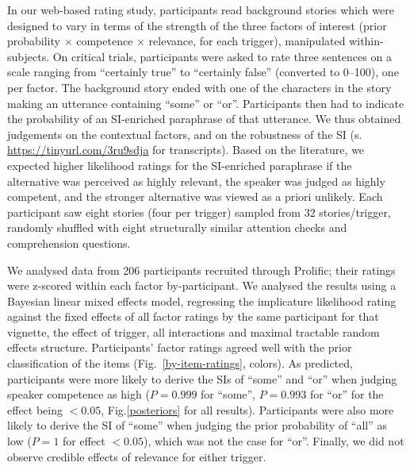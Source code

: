 \documentclass[11pt,letterpaper]{article}
\begin{document}
In our web-based rating study, participants read background stories which were designed to vary in terms of the strength of the three factors of interest (prior probability $\times$ competence $\times$ relevance, for each trigger), manipulated within-subjects. 
On critical trials, participants were asked to rate three sentences on a scale ranging from ``certainly true'' to ``certainly false'' (converted to 0--100), one per factor. The background story ended with
one of the characters in the story making an utterance containing ``some'' or ``or''. Participants then
had to indicate the probability of an SI-enriched paraphrase of that utterance. We thus obtained
judgements on the contextual factors, and on the robustness of the SI (s. \url{https://tinyurl.com/3ru9sdja} for transcripts). Based on
the literature, we expected higher likelihood ratings for the SI-enriched paraphrase if the
alternative was perceived as highly relevant, the speaker was judged as highly competent, and
the stronger alternative was viewed as a priori unlikely. Each participant saw eight stories (four per trigger)
sampled from 32 stories/trigger, randomly shuffled with eight structurally similar attention checks
and comprehension questions.

We analysed data from 206 participants recruited through Prolific; their ratings were z-scored within each factor by-participant. We analysed the results using a Bayesian linear mixed effects model, regressing the implicature likelihood rating against the fixed effects of all factor ratings by the same participant for that vignette, the effect of trigger, all interactions and maximal tractable random effects structure. Participants' factor ratings agreed well with the prior classification of the items (Fig.~\ref{by-item-ratings}, colors).
As predicted, participants were more likely to derive the SIs of ``some'' and ``or'' when judging speaker competence as high ($P=0.999$ for ``some'',  $P=0.993$ for ``or'' for the effect being $<0.05$, Fig.\ref{posteriors} for all results). 
Participants were also more likely to derive the SI of ``some'' when judging the prior probability of ``all'' as low ($P =  1$ for effect $<0.05$), which was not the case for ``or''. %
Finally, we did not observe credible effects of relevance for either trigger.
\end{document}
